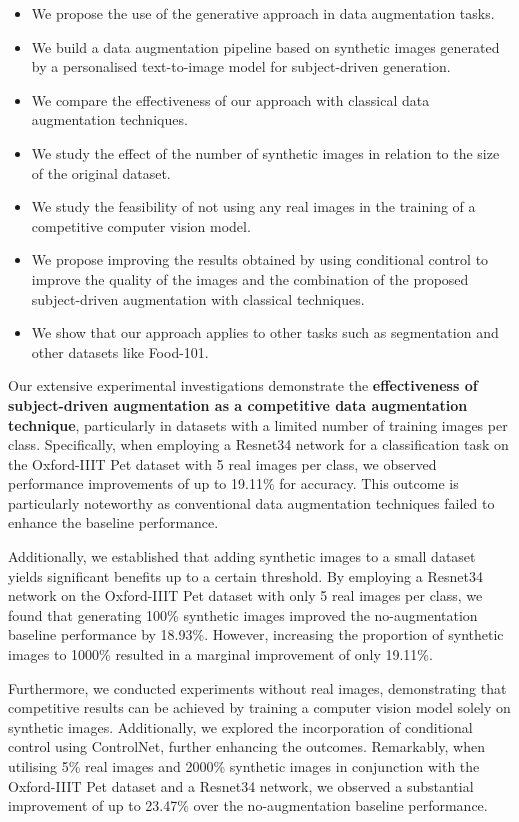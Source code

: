 \begin{itemize}
    \item We propose the use of the generative approach in data augmentation tasks.  
    \item We build a data augmentation pipeline based on synthetic images generated by a personalised text-to-image model for subject-driven generation.
    \item We compare the effectiveness of our approach with classical data augmentation techniques.
    \item We study the effect of the number of synthetic images in relation to the size of the original dataset.
    \item We study the feasibility of not using any real images in the training of a competitive computer vision model.
    \item We propose improving the results obtained by using conditional control to improve the quality of the images and the combination of the proposed subject-driven augmentation with classical techniques.
    \item We show that our approach applies to other tasks such as segmentation and other datasets like Food-101.
\end{itemize}

Our extensive experimental investigations demonstrate the \textbf{effectiveness of subject-driven augmentation as a competitive data augmentation technique}, particularly in datasets with a limited number of training images per class. Specifically, when employing a Resnet34 network for a classification task on the Oxford-IIIT Pet dataset with 5 real images per class, we observed performance improvements of up to 19.11\% for accuracy. This outcome is particularly noteworthy as conventional data augmentation techniques failed to enhance the baseline performance.

Additionally, we established that adding synthetic images to a small dataset yields significant benefits up to a certain threshold. By employing a Resnet34 network on the Oxford-IIIT Pet dataset with only 5 real images per class, we found that generating 100\% synthetic images improved the no-augmentation baseline performance by 18.93\%. However, increasing the proportion of synthetic images to 1000\% resulted in a marginal improvement of only 19.11\%.

Furthermore, we conducted experiments without real images, demonstrating that competitive results can be achieved by training a computer vision model solely on synthetic images. Additionally, we explored the incorporation of conditional control using ControlNet, further enhancing the outcomes. Remarkably, when utilising 5\% real images and 2000\% synthetic images in conjunction with the Oxford-IIIT Pet dataset and a Resnet34 network, we observed a substantial improvement of up to 23.47\% over the no-augmentation baseline performance.

